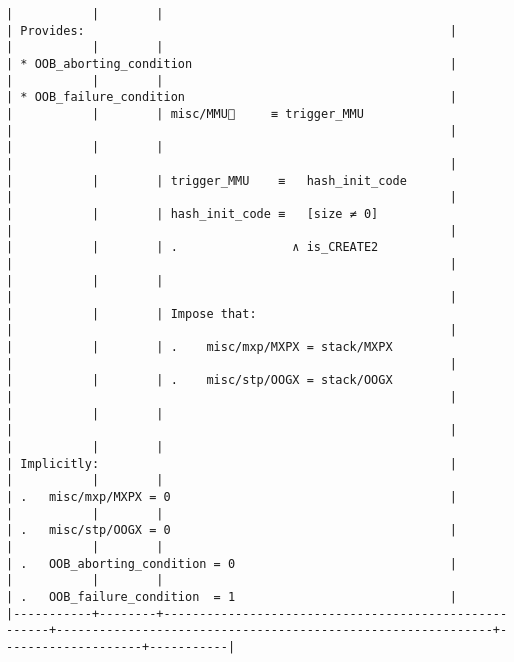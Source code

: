 \documentclass[varwidth=\maxdimen,margin=0.5cm,multi={verbatim}]{standalone}
\begin{document}
\begin{verbatim}
|           |        |                                                      | Provides:                                                   |
|           |        |                                                      | * OOB_aborting_condition                                    |
|           |        |                                                      | * OOB_failure_condition                                     |
|           |        | misc/MMU🚩     ≡ trigger_MMU                         |                                                             |
|           |        |                                                      |                                                             |
|           |        | trigger_MMU    ≡   hash_init_code                    |                                                             |
|           |        | hash_init_code ≡   [size ≠ 0]                        |                                                             |
|           |        | .                ∧ is_CREATE2                        |                                                             |
|           |        |                                                      |                                                             |
|           |        | Impose that:                                         |                                                             |
|           |        | .    misc/mxp/MXPX = stack/MXPX                      |                                                             |
|           |        | .    misc/stp/OOGX = stack/OOGX                      |                                                             |
|           |        |                                                      |                                                             |
|           |        |                                                      | Implicitly:                                                 |
|           |        |                                                      | .   misc/mxp/MXPX = 0                                       |
|           |        |                                                      | .   misc/stp/OOGX = 0                                       |
|           |        |                                                      | .   OOB_aborting_condition = 0                              |
|           |        |                                                      | .   OOB_failure_condition  = 1                              |
|-----------+--------+------------------------------------------------------+-------------------------------------------------------------+--------------------+-----------|

\end{verbatim}
\end{document}
